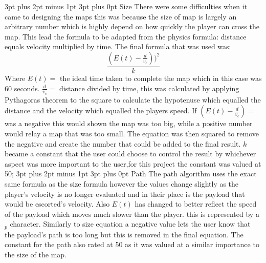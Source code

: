 \documentclass[12pt,a4paper,oneside]{book}
\makeatletter
\renewcommand\subsection{\@startsection {subsection}{1}{2mm} %
                               {3pt plus 2pt minus 1pt} %
                               {3pt plus 0pt} %
                               {\normalfont\bfseries}}
\makeatother
\begin{document}
\subsection{Size}
There were some difficulties when it came to designing the maps this was because the size of map is largely an arbitrary number which is highly depend on how quickly the player can cross the map. This lead the formula to be adapted from the physics formula: distance equals velocity multiplied by time. The final formula that was used was:  
\begin{equation}
\frac{(E(t)  - \frac{d}{v_c}))^2}{k}
\end{equation} 
Where  \(E(t) =\) the ideal time taken to complete the map which in this case was 60 seconds.
 \(\frac{d}{v_c}  =\) distance divided by time, this was calculated by applying Pythagoras theorem to the square to calculate the hypotenuse which equalled the distance and the velocity which equalled the players speed. If \((E(t)  - \frac{d}{v_c}) =\) was a negative this would shown the map was too big, while a positive number would relay a map that was too small. The equation was then squared to remove the negative and create the number that could be added to the final result. \(k \) became a constant that the user could choose to control the result by whichever aspect was more important to the user,for this project the constant was valued at 50;
\subsection{Path}
The path algorithm uses the exact same formula as the size formula however the values change slightly as the player's velocity is no longer evaluated and in their place is the payload that would be escorted's velocity. Also \(E(t) \) has changed to better reflect the speed of the payload which moves much slower than the player. this is represented by a \(_p \) character. Similarly to size equation a negative value lets the user know that the payload's path is too long but this is removed in the final equation. The constant for the path also rated at 50 as it was valued at a similar importance to the size of the map.  
\end{document}
